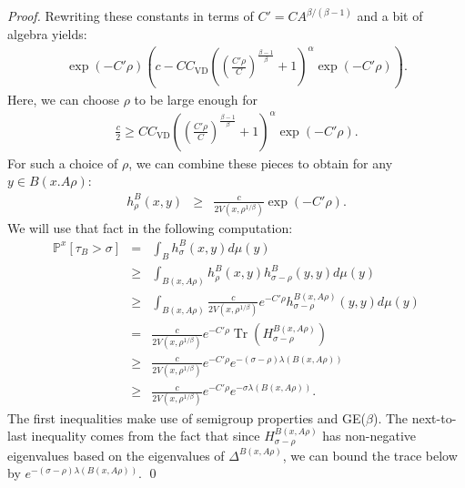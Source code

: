 \documentclass[letterpaper,oneside,english]{amsart}
\begin{document}
\begin{proof}
Rewriting these constants in terms of 
$C' = C A^{\beta/(\beta-1)} $ and a bit of algebra yields:
\begin{eqnarray*}
\exp\left(-C'\rho \right)
\left(
c
- 
C C_{\mathrm{VD}}
\left(
\left(\frac{C' \rho}{C}\right)^{\frac{\beta-1}{\beta}}
+1 \right)^{\alpha}
\exp\left(- C'\rho \right)
\right).
\end{eqnarray*}
Here, we can choose $\rho$ to be large enough for 
\begin{eqnarray*}
\frac{c}{2} \ge
C C_{\mathrm{VD}}
\left(
\left(\frac{C' \rho}{C}\right)^{\frac{\beta-1}{\beta}}
+1 \right)^{\alpha}
\exp\left(- C'\rho \right).
\end{eqnarray*}
For such a choice of $\rho$, we can combine these pieces to obtain for any  $y \in B(x. A\rho)$:
\begin{eqnarray*}
  h_{\rho}^B(x,y) 
&\ge & 
\frac{c}{2V(x,\rho^{1/\beta})} \exp\left(-C'\rho \right).
\end{eqnarray*}
We will use that fact in the following computation:
\begin{eqnarray*}
  \mathbb{P}^{x}[\tau_{B}>\sigma] &=& \int_B h_{\sigma}^B(x,y)d\mu(y) \\
&\ge &  \int_{B(x, A\rho)} h_{\rho}^B(x,y)h_{\sigma-\rho}^B(y,y)d\mu(y)\\
&\ge  &  \int_{B(x, A\rho)} 
\frac{c}{2V(x,\rho^{1/\beta})} e^{-C'\rho}
h_{\sigma-\rho}^{B(x, A\rho)}(y,y)d\mu(y)\\
&=  & 
\frac{c}{2V(x,\rho^{1/\beta})} e^{-C'\rho}
{\operatorname{Tr}}(H_{\sigma-\rho}^{B(x, A\rho)})\\
&\ge & 
\frac{c}{2V(x,\rho^{1/\beta})} e^{-C'\rho}
e^{-(\sigma - \rho)\lambda(B(x, A\rho))}\\
&\ge & 
\frac{c}{2V(x,\rho^{1/\beta})} e^{-C'\rho}
e^{-\sigma\lambda(B(x, A\rho))}.
\end{eqnarray*}
The first inequalities make use of semigroup properties and GE($\beta$).
The next-to-last inequality comes from the fact that since
$H^{B(x, A\rho)}_{\sigma-\rho}$ has non-negative eigenvalues based on the
eigenvalues of $\Delta^{B(x, A\rho)}$, we can bound the trace below by
$e^{-(\sigma - \rho)\lambda(B(x, A\rho))}$. 
\qed
\end{proof}
\end{document}
